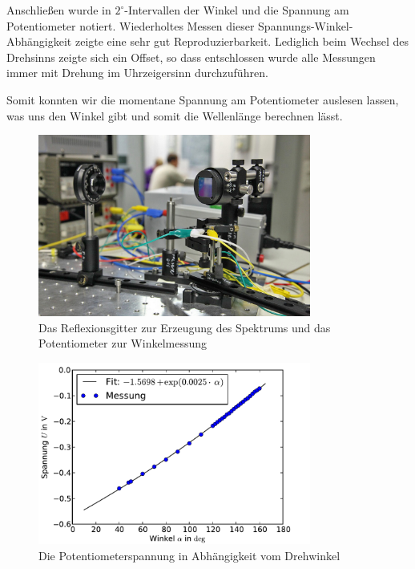 \documentclass[11pt]{scrartcl}
\begin{document}
Anschließen wurde in $2^\circ$-Intervallen der Winkel und die Spannung am Potentiometer notiert. Wiederholtes Messen dieser Spannungs-Winkel-Abhängigkeit zeigte eine sehr gut Reproduzierbarkeit. Lediglich beim Wechsel des Drehsinns zeigte sich ein Offset, so dass entschlossen wurde alle Messungen immer mit Drehung im Uhrzeigersinn durchzuführen.

Somit konnten wir die momentane Spannung am Potentiometer auslesen lassen, was uns den Winkel gibt und somit die Wellenlänge berechnen lässt.
\begin{figure}[ht]
\begin{center}
\includegraphics[width=0.8\textwidth]{images/poti-reflexgitter.jpg}
\end{center}
\vspace{-1.5\baselineskip}
\caption{Das Reflexionsgitter zur Erzeugung des Spektrums und das Potentiometer zur Winkelmessung}
\label{winkel_spannung}
\end{figure}

\begin{figure}[ht]
\begin{center}
\includegraphics[width=0.8\textwidth]{images/winkel_spannung.pdf}
\end{center}
\vspace{-1.5\baselineskip}
\caption{Die Potentiometerspannung in Abhängigkeit vom Drehwinkel}
\label{winkel_spannung}
\end{figure}
\end{document}
